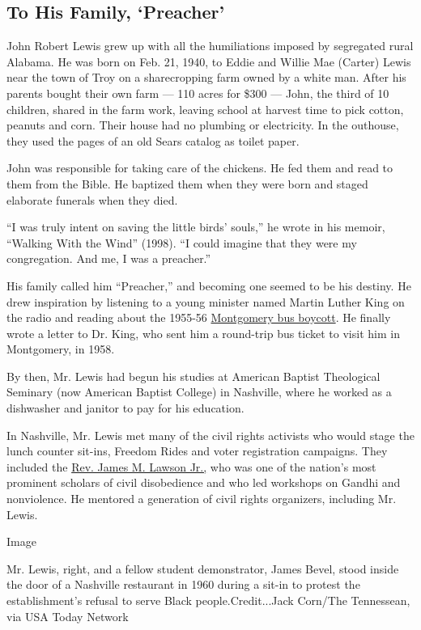\hypertarget{to-his-family-preacher}{%
\subsection{To His Family, `Preacher'}\label{to-his-family-preacher}}

John Robert Lewis grew up with all the humiliations imposed by
segregated rural Alabama. He was born on Feb. 21, 1940, to Eddie and
Willie Mae (Carter) Lewis near the town of Troy on a sharecropping farm
owned by a white man. After his parents bought their own farm --- 110
acres for \$300 --- John, the third of 10 children, shared in the farm
work, leaving school at harvest time to pick cotton, peanuts and corn.
Their house had no plumbing or electricity. In the outhouse, they used
the pages of an old Sears catalog as toilet paper.

John was responsible for taking care of the chickens. He fed them and
read to them from the Bible. He baptized them when they were born and
staged elaborate funerals when they died.

``I was truly intent on saving the little birds' souls,'' he wrote in
his memoir, ``Walking With the Wind'' (1998). ``I could imagine that
they were my congregation. And me, I was a preacher.''

His family called him ``Preacher,'' and becoming one seemed to be his
destiny. He drew inspiration by listening to a young minister named
Martin Luther King on the radio and reading about the 1955-56
\href{https://www.history.com/topics/black-history/montgomery-bus-boycott}{Montgomery
bus boycott}. He finally wrote a letter to Dr. King, who sent him a
round-trip bus ticket to visit him in Montgomery, in 1958.

By then, Mr. Lewis had begun his studies at American Baptist Theological
Seminary (now American Baptist College) in Nashville, where he worked as
a dishwasher and janitor to pay for his education.

In Nashville, Mr. Lewis met many of the civil rights activists who would
stage the lunch counter sit-ins, Freedom Rides and voter registration
campaigns. They included the
\href{https://jameslawsoninstitute.org/history/}{Rev. James M. Lawson
Jr.,} who was one of the nation's most prominent scholars of civil
disobedience and who led workshops on Gandhi and nonviolence. He
mentored a generation of civil rights organizers, including Mr. Lewis.

Image

Mr. Lewis, right, and a fellow student demonstrator, James Bevel, stood
inside the door of a Nashville restaurant in 1960 during a sit-in to
protest the establishment's refusal to serve Black people.Credit...Jack
Corn/The Tennessean, via USA Today Network

